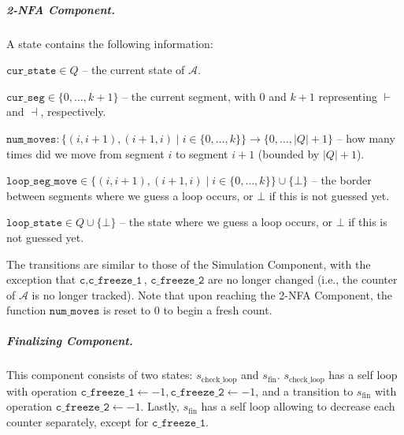 \documentclass[11pt,a4paper]{amsart}
\theoremstyle{definition}
\newcommand{\lmark}{\vdash}
\newcommand{\rmark}{\dashv}
\newcommand{\adds}[1]{\leftarrow #1}
\newcommand{\vf}[1]{\texttt{#1}}
\newcommand{\cA}{\mathcal{A}}
\begin{document}
\subparagraph*{2-NFA Component.} A state contains the following information:
\begin{compactitem}
\item $\vf{cur\_state}\in Q$ -- the current state of $\cA$.
\item $\vf{cur\_seg}\in \{0,\ldots,k+1\}$ -- the current segment, with $0$ and $k+1$
representing $\lmark$ and $\rmark$, respectively.
\item $\vf{num\_moves}\colon\{(i,i+1),(i+1,i)\mid i\in \{0,\ldots,k\}\}\to \{0,\ldots,|Q|+1\}$ --
how many times did we move from segment $i$ to segment $i+1$ (bounded by
$|Q|+1$).
\item $\vf{loop\_seg\_move}\in \{(i,i+1),(i+1,i)\mid i\in \{0,\ldots,k\}\}\cup\{\bot\}$ -- the
border between segments where we guess a loop occurs, or $\bot$ if this is not
guessed yet.
\item $\vf{loop\_state}\in Q\cup\{\bot\}$ -- the state where we guess a loop occurs,
or $\bot$ if this is not guessed yet.
\end{compactitem} 
The transitions are similar to those of the Simulation Component,
with the exception that $\vf{c},\vf{c\_freeze\_1}$, $\vf{c\_freeze\_2}$ are no
longer changed (i.e., the counter of $\cA$ is no longer tracked). Note that upon
reaching the 2-NFA Component, the function $\vf{num\_moves}$ is reset to $0$ to
begin a fresh count.

\subparagraph*{Finalizing Component.} This component consists of two states:
$s_{\textrm{check\_loop}}$ and $s_{\textrm{fin}}$. $s_{\textrm{check\_loop}}$
has a self loop with operation
$\vf{c\_freeze\_1}\adds{-1},\vf{c\_freeze\_2}\adds{-1}$, and a transition to
$s_{\textrm{fin}}$ with operation $\vf{c\_freeze\_2}\adds{-1}$. Lastly,
$s_{\textrm{fin}}$ has a self loop allowing to decrease each counter separately,
except for $\vf{c\_freeze\_1}$.
\end{document}
